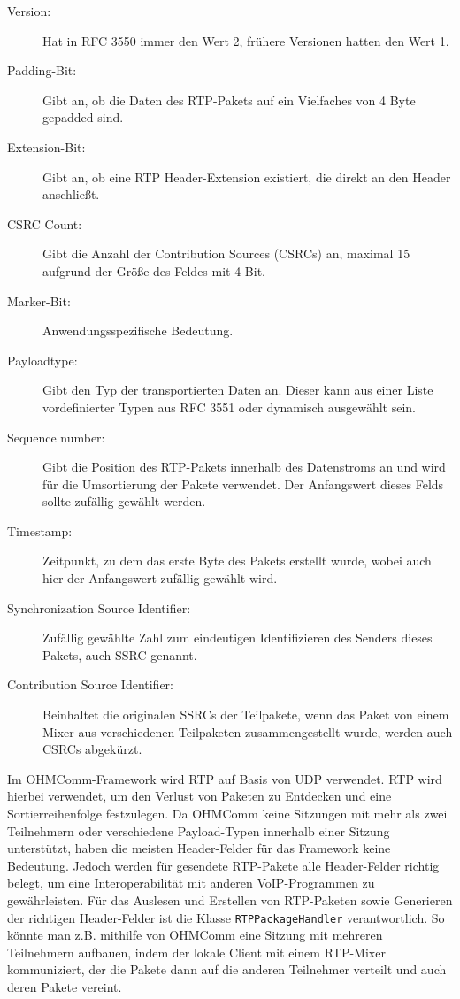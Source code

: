 \begin{description}
\item[Version:] Hat in RFC 3550 immer den Wert 2, frühere Versionen hatten den Wert 1.
\item[Padding-Bit:] Gibt an, ob die Daten des RTP-Pakets auf ein Vielfaches von 4 Byte gepadded sind.
\item[Extension-Bit:] Gibt an, ob eine RTP Header-Extension existiert, die direkt an den Header anschließt.
\item[CSRC Count:] Gibt die Anzahl der Contribution Sources (CSRCs) an, maximal 15 aufgrund der Größe des Feldes mit 4 Bit.
\item[Marker-Bit:] Anwendungsspezifische Bedeutung.
\item[Payloadtype:] Gibt den Typ der transportierten Daten an. Dieser kann aus einer Liste vordefinierter Typen aus RFC 3551 oder dynamisch ausgewählt sein.
\item[Sequence number:] Gibt die Position des RTP-Pakets innerhalb des Datenstroms an und wird für die Umsortierung der Pakete verwendet. Der Anfangswert dieses Felds sollte zufällig gewählt werden.
\item[Timestamp:] Zeitpunkt, zu dem das erste Byte des Pakets erstellt wurde, wobei auch hier der Anfangswert zufällig gewählt wird.
\item[Synchronization Source Identifier:] Zufällig gewählte Zahl zum eindeutigen Identifizieren des Senders dieses Pakets, auch SSRC genannt.
\item[Contribution Source Identifier:] Beinhaltet die originalen SSRCs der Teilpakete, wenn das Paket von einem Mixer aus verschiedenen Teilpaketen zusammengestellt wurde, werden auch CSRCs abgekürzt.
\end{description}
Im OHMComm-Framework wird RTP auf Basis von UDP verwendet. RTP wird hierbei verwendet, um den Verlust von Paketen zu Entdecken und eine Sortierreihenfolge festzulegen. Da OHMComm keine Sitzungen mit mehr als zwei Teilnehmern oder verschiedene Payload-Typen innerhalb einer Sitzung unterstützt, haben die meisten Header-Felder für das Framework keine Bedeutung. Jedoch werden für gesendete RTP-Pakete alle Header-Felder richtig belegt, um eine Interoperabilität mit anderen VoIP-Programmen zu gewährleisten. Für das Auslesen und Erstellen von RTP-Paketen sowie Generieren der richtigen Header-Felder ist die Klasse \texttt{RTPPackageHandler} verantwortlich. So könnte man z.B. mithilfe von OHMComm eine  Sitzung mit mehreren Teilnehmern aufbauen, indem der lokale Client mit einem RTP-Mixer kommuniziert, der die Pakete dann auf die anderen Teilnehmer verteilt und auch deren Pakete vereint.
